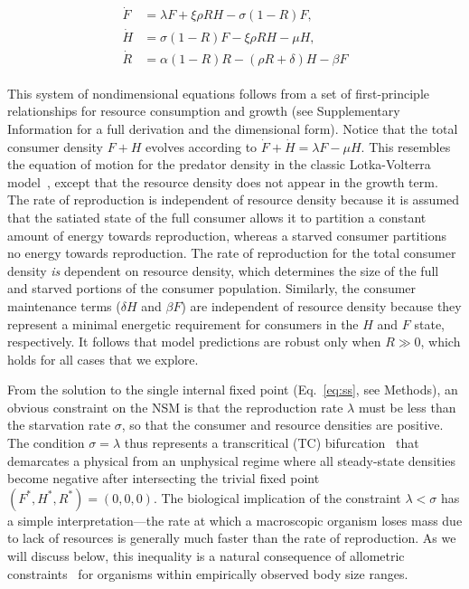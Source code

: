 \documentclass[twocolumn,preprintnumbers,amsmath,amssymb,superscriptaddress]{revtex4}
\begin{document}
\begin{bibunit}[unsrt]
\begin{align}
\label{eq:system}
\begin{split}
\dot{F} &= \lambda F + \xi \rho RH - \sigma \left(1-R\right)F,  \\
\dot{H} &= \sigma \left(1-R\right)F - \xi \rho RH - \mu H,  \\
\dot{R} &= \alpha \left(1-R\right)R -\left(\rho R+\delta\right)H-\beta F
\end{split}
\end{align}

This system of nondimensional equations follows from a set of first-principle relationships for resource consumption and growth (see Supplementary Information for a full derivation and the dimensional form).
Notice that the total consumer density $F+H$ evolves according to $\dot{F}+\dot{H}=\lambda F-\mu H$.
This resembles the equation of motion for the predator density in the classic Lotka-Volterra model~\citep{murray2011mathematical}, except that the resource density does not appear in the growth term.
The rate of reproduction is independent of resource density because it is assumed that the satiated state of the full consumer allows it to partition a constant amount of energy towards reproduction, whereas a starved consumer partitions no energy towards reproduction.
The rate of reproduction for the total consumer density \emph{is} dependent on resource density, which determines the size of the full and starved portions of the consumer population.
Similarly, the consumer maintenance terms ($\delta H$ and $\beta F$) are independent of resource density because they represent a minimal energetic requirement for consumers in the $H$ and $F$ state, respectively.
It follows that model predictions are robust only when $R \gg 0$, which holds for all cases that we explore.


From the solution to the single internal fixed point (Eq.~\eqref{eq:ss}, see Methods), an obvious constraint on the NSM is that the reproduction rate $\lambda$ must be less than the starvation rate $\sigma$, so that the consumer and resource densities are positive.
The condition $\sigma = \lambda$ thus represents a transcritical (TC) bifurcation~\citep{Strogatz:2008wo} that demarcates a physical from an unphysical regime where all steady-state densities become negative after intersecting the trivial fixed point $(F^*,H^*,R^*)=(0,0,0)$.
The biological implication of the constraint $\lambda<\sigma$ has a simple interpretation---the rate at which a macroscopic organism loses mass due to lack of resources is generally much faster than the rate of reproduction.
As we will discuss below, this inequality is a natural consequence of allometric constraints~\citep{Kempes:2012hy} for organisms within empirically observed body size ranges. %


\end{bibunit}
\end{document}
